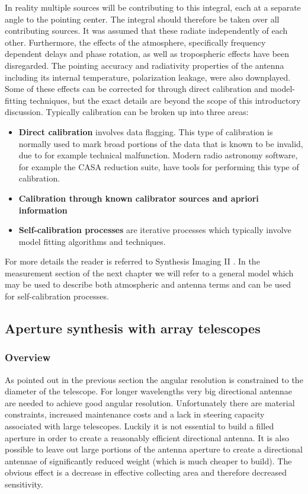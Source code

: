 \documentclass[a4paper,10pt]{report}
\begin{document}
In reality multiple sources will be contributing to this integral, each at a separate angle to the pointing center. The integral should therefore be taken over 
all contributing sources. It was assumed that these radiate independently of each other. Furthermore, the effects of the atmosphere, specifically frequency 
dependent delays and phase rotation, as well as tropospheric effects have been disregarded. The pointing accuracy and radiativity properties of the antenna including its internal 
temperature, polarization leakage, were also downplayed. Some of these effects can be corrected for through direct calibration and model-fitting techniques, 
but the exact details are beyond the scope of this introductory discussion. Typically calibration can be broken up into three areas:
\begin{itemize}
 \item \textbf{Direct calibration} involves data flagging. This type of calibration is normally used to mark broad portions of the data that is known to be invalid, due to for example
 technical malfunction. Modern radio astronomy software, for example the CASA reduction suite, have tools for performing this type of calibration.
 \item \textbf{Calibration through known calibrator sources and apriori information} 
 \item \textbf{Self-calibration processes} are iterative processes which typically involve model fitting algorithms and techniques.
\end{itemize}

For more details the reader is referred to Synthesis Imaging II \cite[Lectures 3, 5, 8 and 10]{taylor1999synthesis}. In the measurement section of the next chapter
we will refer to a general model which may be used to describe both atmospheric and antenna terms and can be used for self-calibration processes.

\subsection{Aperture synthesis with array telescopes}
\subsubsection{Overview}
As pointed out in the previous section the angular resolution is constrained to the diameter of the telescope. For longer 
wavelengths very big directional antennae are needed to achieve good angular resolution. Unfortunately 
there are material constraints, increased maintenance costs and a lack in steering capacity associated with large telescopes. 
Luckily it is not essential to build a filled aperture in order to create a reasonably efficient directional antenna. It is 
also possible to leave out large portions of the antenna aperture to create a directional antennae of significantly 
reduced weight (which is much cheaper to build). The obvious effect is a decrease in effective collecting area
and therefore decreased sensitivity.
\end{document}
